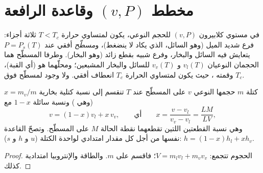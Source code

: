 \section{مخطط $(v, P)$ وقاعدة الرافعة}

\begin{proposition}\label{prop:b1:phase-changes:andrews}
في مستوي كلابيرون $(v, P)$ للحجم النوعي، يكون لمتساوي حرارة
$T < T_c$ ثلاثة أجزاء: فرع شديد الميل (وهو السائل، الذي يكاد
لا ينضغط)، و\emph{مسطّح} أفقي عند $P = P_s(T)$ يتعايش فيه السائل
والبخار، وفرع شبيه بقطع زائد (وهو البخار). وطرفا المسطّح
هما الحجمان النوعيان $v_l(T)$ و $v_v(T)$ للسائل والبخار
المشبعين؛ ومحلّهما هو \emph{} (أي
القبة)، وقمته ، حيث يكون لمتساوي الحرارة $T_c$
انعطاف أفقي. ولا وجود لمسطّح فوق $T_c$.
\end{proposition}
\admitted

\begin{theorem}\label{thm:b1:phase-changes:lever}
كتلة $m$ حجمها النوعي $v$ على المسطّح عند $T$ تنقسم إلى
نسبة كتلية بخارية $x = m_v/m$ (وهي \emph{}) ونسبة
سائلة $1 - x$ مع
\[
v = (1 - x)v_l + x\,v_v , \qquad\text{أي}\qquad
x = \frac{v - v_l}{v_v - v_l} = \frac{LM}{LV} ,
\]
وهي نسبة القطعتين اللتين تقطعهما نقطة الحالة $M$ على المسطّح.
وتصحّ القاعدة نفسها من أجل كل مقدار امتدادي لواحدة الكتلة ($u$
و $h$ و $s$): $h = (1 - x)h_l + xh_v$.
\end{theorem}

\begin{proof}
الحجوم تتجمع: $V = m_lv_l + m_vv_v$؛ فاقسم على $m$. والطاقة 
والإنتروبيا امتدادية كذلك.
\end{proof}

